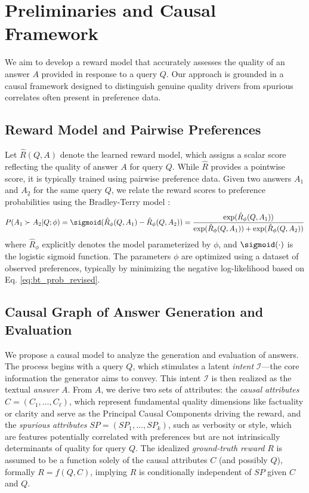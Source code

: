 \section{Preliminaries and Causal Framework}
\label{sec:preliminaries}

We aim to develop a reward model that accurately assesses the quality of an answer $A$ provided in response to a query $Q$. Our approach is grounded in a causal framework designed to distinguish genuine quality drivers from spurious correlates often present in preference data.

\subsection{Reward Model and Pairwise Preferences}
Let $\hat{R}(Q, A)$ denote the learned reward model, which assigns a scalar score reflecting the quality of answer $A$ for query $Q$. While $\hat{R}$ provides a pointwise score, it is typically trained using pairwise preference data. Given two answers $A_1$ and $A_2$ for the same query $Q$, we relate the reward scores to preference probabilities using the Bradley-Terry model \cite{bradley1952rank}:
\begin{equation}
P(A_1 \succ A_2 | Q; \phi) = \sigmoid(\hat{R}_\phi(Q, A_1) - \hat{R}_\phi(Q, A_2)) = \frac{\exp(\hat{R}_\phi(Q, A_1))}{\exp(\hat{R}_\phi(Q, A_1)) + \exp(\hat{R}_\phi(Q, A_2))}
\label{eq:bt_prob_revised}
\end{equation}
where $\hat{R}_\phi$ explicitly denotes the model parameterized by $\phi$, and $\sigmoid(\cdot)$ is the logistic sigmoid function. The parameters $\phi$ are optimized using a dataset of observed preferences, typically by minimizing the negative log-likelihood based on Eq. \ref{eq:bt_prob_revised}.

\subsection{Causal Graph of Answer Generation and Evaluation}
\label{subsec:causal_graph_revised}

We propose a causal model to analyze the generation and evaluation of answers. The process begins with a query \(Q\), which stimulates a latent \emph{intent} \(\mathcal{I}\)—the core information the generator aims to convey. This intent \(\mathcal{I}\) is then realized as the textual \emph{answer} \(A\). From $A$, we derive two sets of attributes: the \emph{causal attributes} \(C = (C_1,\dots,C_{\ell})\), which represent fundamental quality dimensions like factuality or clarity and serve as the Principal Causal Components driving the reward, and the \emph{spurious attributes} \(SP = (SP_1,\dots,SP_{k})\), such as verbosity or style, which are features potentially correlated with preferences but are not intrinsically determinants of quality for query \(Q\). The idealized \emph{ground-truth reward} \(R\) is assumed to be a function solely of the causal attributes $C$ (and possibly $Q$), formally $R = f(Q, C)$, implying $R$ is conditionally independent of $SP$ given $C$ and $Q$.


